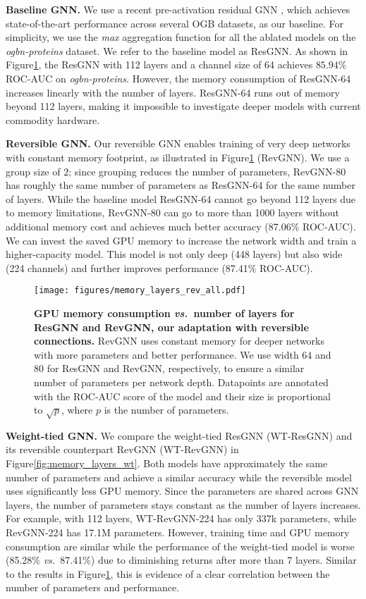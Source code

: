 \documentclass{article}
\newcommand{\vs}{\emph{vs.~}}
\newcommand{\figLabel}{Figure\xspace}
\newcommand{\mysection}[1]{\vspace{0pt}\noindent\textbf{#1.}}
\begin{document}
\mysection{Baseline GNN}
We use a recent pre-activation residual GNN \citep{li2020deepergcn}, which achieves state-of-the-art performance across several OGB datasets, as our baseline. For simplicity, we use the \emph{max} aggregation function for all the ablated models on the \emph{ogbn-proteins} dataset. We refer to the baseline model as ResGNN. As shown in \figLabel \ref{fig:rev_memory_layers}, the ResGNN with 112 layers and a channel size of 64 achieves $85.94\%$ ROC-AUC on \emph{ogbn-proteins}. However, the memory consumption of ResGNN-64 increases linearly with the number of layers. ResGNN-64 runs out of memory beyond 112 layers, making it impossible to investigate deeper models with current commodity hardware.


\mysection{Reversible GNN}
Our reversible GNN enables training of very deep networks with constant memory footprint, as illustrated in \figLabel \ref{fig:rev_memory_layers} (RevGNN). We use a group size of $2$; since grouping reduces the number of parameters, RevGNN-80 has roughly the same number of parameters as ResGNN-64 for the same number of layers. While the baseline model ResGNN-64 cannot go beyond 112 layers due to memory limitations, RevGNN-80 can go to more than 1000 layers without additional memory cost and achieves much better accuracy (87.06\% ROC-AUC). 
We can invest the saved GPU memory to increase the network width and train a higher-capacity model. This model is not only deep (448 layers) but also wide (224 channels) and further improves performance (87.41\% ROC-AUC).

\begin{figure}[!t]
    \centering
    \texttt{[image: figures/memory\_layers\_rev\_all.pdf]}
    \caption{\textbf{GPU memory consumption \vs number of layers for ResGNN \citep{li2020deepergcn} and RevGNN, our adaptation with reversible connections.} RevGNN uses constant memory for deeper networks with more parameters and better performance. We use width $64$ and $80$ for ResGNN and RevGNN, respectively, to ensure a similar number of parameters per network depth. Datapoints are annotated with the ROC-AUC score of the model and their size is proportional to $\sqrt{p}$, where $p$ is the number of parameters.}
    \label{fig:rev_memory_layers}
\end{figure}

\mysection{Weight-tied GNN}
We compare the weight-tied ResGNN (WT-ResGNN) and its reversible counterpart RevGNN (WT-RevGNN) in \figLabel \ref{fig:memory_layers_wt}. Both models have approximately the same number of parameters and achieve a similar accuracy while the reversible model uses significantly less GPU memory. Since the parameters are shared across GNN layers, the number of parameters stays constant as the number of layers increases. For example, with 112 layers, WT-RevGNN-224 has only 337k parameters, while RevGNN-224 has 17.1M parameters. However, training time and GPU memory consumption are similar while the performance of the weight-tied model is worse (85.28\% \vs 87.41\%) due to diminishing returns after more than 7 layers. Similar to the results in \figLabel \ref{fig:rev_memory_layers}, this is evidence of a clear correlation between the number of parameters and performance.  
\end{document}
